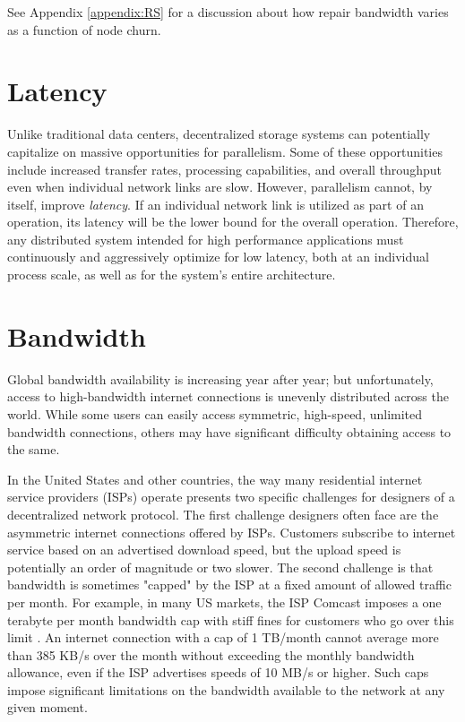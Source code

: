 \documentclass[11pt,fleqn,openany]{book}
\begin{document}
See Appendix \ref{appendix:RS} for a discussion about how repair bandwidth
varies as a function of node churn.

\section{Latency}

Unlike traditional data centers,
decentralized storage systems can potentially capitalize on
massive opportunities for parallelism.
Some of these opportunities include increased transfer rates, processing
capabilities, and overall throughput even when individual
network links are slow. However, parallelism cannot, by itself, improve {\em
latency}. If an individual network link is utilized as part of an operation,
its latency will be the lower bound for the overall operation.
Therefore, any distributed system
intended for high performance applications must continuously and aggressively
optimize for low latency, both at an individual process scale, as well as for
the system's entire architecture.

\section{Bandwidth}\label{sec:req-bandwidth}

Global bandwidth availability is increasing year after year; but unfortunately,
access to
high-bandwidth internet connections is unevenly distributed across the world.
While some users can easily access symmetric, high-speed, unlimited bandwidth
connections, others may have significant difficulty obtaining access to the same.

In the United States and other countries,
the way many residential internet service providers (ISPs)
operate presents two specific challenges for designers of a
decentralized network protocol. The first challenge designers often face are
the asymmetric internet connections offered by ISPs.
Customers subscribe to internet service
based on an advertised download speed, but the upload speed is potentially an
order of magnitude or two slower. The second challenge is that bandwidth is
sometimes "capped" by the ISP at a fixed amount of allowed traffic per month.
For example, in many
US markets, the ISP Comcast imposes a one terabyte per month bandwidth cap
with stiff fines for customers who go over this limit \cite{comcast-cap}.
An internet connection with a cap of 1 TB/month cannot average more than
385 KB/s over the month without exceeding the monthly bandwidth allowance,
even if the ISP advertises speeds of 10 MB/s or higher.
Such caps impose
significant limitations on the bandwidth available to the network
at any given moment.
\end{document}
